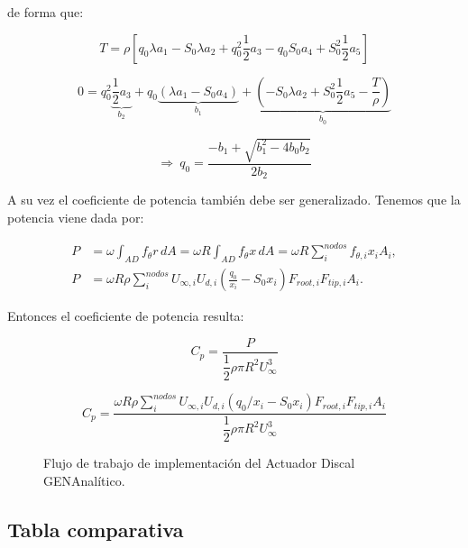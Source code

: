 de forma que:

\begin{equation}
T = \rho\left[q_0\lambda a_1 - S_0\lambda a_2 + q_0^2\frac{1}{2}a_3 - q_0 S_0 a_4 + S_0^2\frac{1}{2}a_5\right]
\label{eq:genanalytic_T3}
\end{equation}

\begin{equation}
0 = q_0^2\underbrace{\frac{1}{2}a_3}_{b_2} + q_0\underbrace{(\lambda a_1 - S_0 a_4)}_{b_1} + \underbrace{\left(-S_0\lambda a_2 + S_0^2\frac{1}{2}a_5 - \frac{T}{\rho}\right)}_{b_0}
\label{eq:genanalytic_T4}
\end{equation}

\begin{equation}
\Rightarrow\ q_0 = \frac{-b_1 + \sqrt{b_1^2 - 4 b_0 b_2}}{2 b_2}
\label{eq:genanalytic_q0}
\end{equation}

A su vez el coeficiente de potencia también debe ser generalizado. Tenemos que la potencia viene dada por:

\begin{align}
P &= \omega\int_{AD} f_\theta r\, dA = \omega R\int_{AD} f_\theta x\, dA = \omega R\sum_{i}^{nodos} f_{\theta,i}x_i A_i, \label{eq:genanalytic_P1}\\
P &= \omega R\rho\sum_{i}^{nodos} U_{\infty,i}U_{d,i}\left(\frac{q_0}{x_i} - S_0 x_i\right)F_{root,i}F_{tip,i}A_i. \label{eq:genanalytic_P2}
\end{align}

Entonces el coeficiente de potencia resulta:

\begin{equation}
C_p = \frac{P}{\dfrac{1}{2}\rho\pi R^2 U_\infty^3}
\label{eq:genanalytic_Cp1}
\end{equation}

\begin{equation}
C_p = \frac{\omega R\rho \sum_{i}^{nodos} U_{\infty,i}U_{d,i}\left(q_0/x_i - S_0 x_i\right)F_{root,i}F_{tip,i}A_i}{\dfrac{1}{2}\rho\pi R^2 U_\infty^3}
\label{eq:genanalytic_Cp2}
\end{equation}

\begin{figure}[h]
\centering
\caption{Flujo de trabajo de implementación del Actuador Discal GENAnalítico.}
\label{fig:impl_analitico}
\end{figure}

\subsection{Tabla comparativa}

